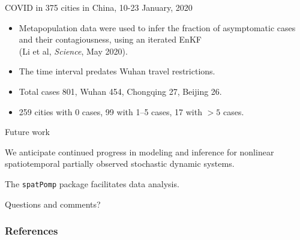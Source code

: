 \documentclass{beamer}
\begin{document}

\begin{frame}{COVID in 375 cities in China, 10-23 January, 2020}

  \begin{itemize}
  \item Metapopulation data were used to infer the fraction of asymptomatic cases and their contagiousness, using an iterated EnKF \\
    (Li et al, {\it Science}, May 2020).
   \item
    The time interval predates Wuhan travel restrictions.
   \item Total cases 801, Wuhan 454, Chongqing 27, Beijing 26.
   \item 259 cities with 0 cases, 99 with 1--5 cases, 17 with $>5$ cases.
\end{itemize}     

\end{frame}

\begin{frame}{Future work}

  \newcommand\futuresep{\vspace{5mm}}
  
  \begin{myitemize}

  \item We anticipate continued progress in modeling and inference for nonlinear spatiotemporal partially observed stochastic dynamic systems.

    \futuresep
    
  \item The \texttt{spatPomp} package facilitates data analysis.

    \futuresep

    \item Questions and comments?
    
\end{myitemize}

\end{frame}

\nocite{asfaw23arxiv,bjornstad01,breto19,grenfell04,he10,ionides21,ionides22,lee20,li20,ng02,ning23-ibpf,park20,rebeschini15,wheeler23}

\begin{frame}[allowframebreaks]
\frametitle{References}


\end{frame}

\end{document}
